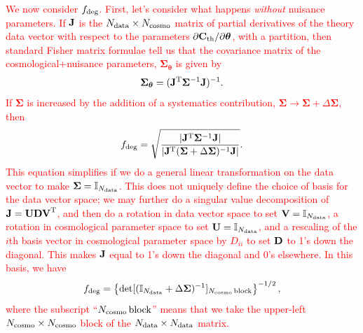 \documentclass[usenatbib]{mnras}
\newcommand{\changetext}[1]{\textcolor{red}{#1}}
\begin{document}
\changetext{
We now consider $f_{\rm deg}$. First, let's consider what happens {\em without} nuisance parameters. If ${\bf J}$ is the $N_{\rm data} \times N_{\rm cosmo}$ matrix of partial derivatives of the theory data vector with respect to the parameters $\partial{\bf C}_{\rm th}/\partial{\boldsymbol\theta}$, with a partition, then standard Fisher matrix formulae tell us that the covariance matrix of the cosmological+nuisance parameters, ${\boldsymbol\Sigma}_{\boldsymbol\theta}$ is given by
\begin{equation}
{\boldsymbol\Sigma}_{\boldsymbol\theta} = ({\bf J}^{\rm T}{\boldsymbol\Sigma}^{-1}{\bf J})^{-1}.
\end{equation}
If ${\boldsymbol\Sigma}$ is increased by the addition of a systematics contribution,  ${\boldsymbol\Sigma} \rightarrow {\boldsymbol\Sigma} +\Delta{\boldsymbol\Sigma}$, then 
\begin{equation}
f_{\rm deg} = \sqrt{ \frac{ |{\bf J}^{\rm T}{\boldsymbol\Sigma}^{-1}{\bf J} |}
{| {\bf J}^{\rm T}({\boldsymbol\Sigma}+\Delta{\boldsymbol\Sigma})^{-1}{\bf J} | } }.
\label{eq:fdeg-.5}
\end{equation}
This equation simplifies if we do a general linear transformation on the data vector to make ${\boldsymbol\Sigma} = {\mathbb I}_{N_{\rm data}}$. This does not uniquely define the choice of basis for the data vector space; we may further do a singular value decomposition of ${\bf J} = {\bf UDV}^{\rm T}$, and then do a rotation in data vector space to set ${\bf V} = {\mathbb I}_{N_{\rm data}}$, a rotation in cosmological parameter space to set ${\bf U} = {\mathbb I}_{N_{\rm data}}$, and a rescaling of the $i$th basis vector in cosmological parameter space by $D_{ii}$ to set ${\bf D}$ to 1's down the diagonal. This makes ${\bf J}$ equal to 1's down the diagonal and 0's elsewhere. In this basis, we have
\begin{equation}
f_{\rm deg} = \left\{ \det [({\mathbb I}_{N_{\rm data}} + \Delta{\boldsymbol\Sigma})^{-1}]_{N_{\rm cosmo}\,\rm block} \right\}^{-1/2},
\end{equation}
where the subscript ``$N_{\rm cosmo}\,\rm block$'' means that we take the upper-left $N_{\rm cosmo}\times N_{\rm cosmo}$ block of the $N_{\rm data}\times N_{\rm data}$ matrix.}
\end{document}
